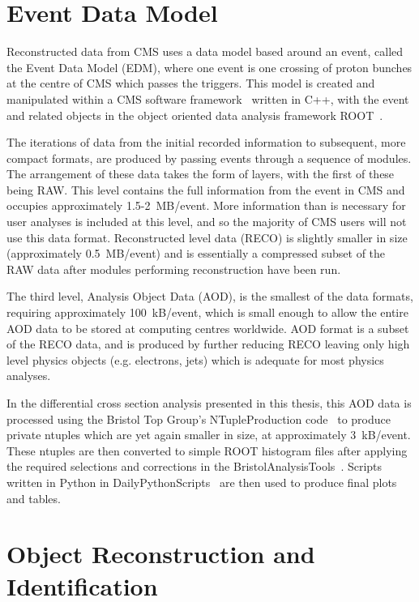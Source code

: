 \section{Event Data Model}
\label{s:Event_Data_Model}
Reconstructed data from CMS uses a data model based around an event, called the Event Data Model (EDM), where
one event is one crossing of proton bunches at the centre of CMS which passes the triggers. This model
is created and manipulated within a CMS software framework~\cite{cmssw} written in C++, with the event
and related objects in the object oriented data analysis framework ROOT~\cite{ROOT}.

The iterations of data from the initial recorded information to subsequent, more compact formats, are produced
by passing events through a sequence of modules. The arrangement of these data takes the form of layers, with
the first of these being RAW. This level contains the full information from the event in CMS and occupies
approximately 1.5-2~MB/event. More information than is necessary for user analyses is included at this level,
and so the majority of CMS users will not use this data format. Reconstructed level data (RECO) is slightly
smaller in size (approximately 0.5~MB/event) and is essentially a compressed subset of the RAW data after
modules performing reconstruction have been run.

The third level, Analysis Object Data (AOD), is the smallest of the data formats, requiring approximately
100~kB/event, which is small enough to allow the entire AOD data to be stored at computing centres worldwide.
AOD format is a subset of the RECO data, and is produced by further reducing RECO leaving only high level
physics objects (e.g. electrons, jets) which is adequate for most physics analyses. 

In the differential cross section analysis presented in this thesis, this AOD data is processed using the
Bristol Top Group's NTupleProduction code~\cite{NTT_LukeKreczko_SergeySenkin_JesonJacob_EmyrClement_2015} to
produce private ntuples which are yet again smaller in size, at approximately 3~kB/event. These ntuples are
then converted to simple ROOT histogram files after applying the required selections and corrections in the
BristolAnalysisTools~\cite{BAT_LukeKreczko_JesonJacob_SergeySenkin_EmyrClement_2015}. Scripts written in
Python in DailyPythonScripts~\cite{DPS_LukeKreczko_SergeySenkin_JesonJacob_EmyrClement_2015} are then used to
produce final plots and tables.


\section{Object Reconstruction and Identification}
\label{s:object_reconstruction_and_identification}

